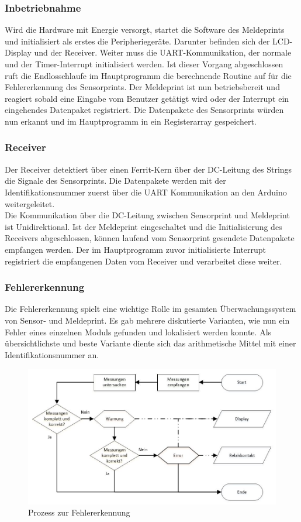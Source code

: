 \subsubsection{Inbetriebnahme}
Wird die Hardware mit Energie versorgt, startet die Software des Meldeprints und initialisiert als erstes die Peripheriegeräte. Darunter befinden sich der LCD-Display und der Receiver. Weiter muss die UART-Kommunikation, der normale und der Timer-Interrupt initialisiert werden. Ist dieser Vorgang abgeschlossen ruft die Endlosschlaufe im Hauptprogramm die berechnende Routine auf für die Fehlererkennung des Sensorprints. Der Meldeprint ist nun betriebsbereit und reagiert sobald eine Eingabe vom Benutzer getätigt wird oder der Interrupt ein eingehendes Datenpaket registriert. Die Datenpakete des Sensorprints würden nun erkannt und im Hauptprogramm in ein Registerarray gespeichert.

\subsubsection{Receiver}
Der Receiver detektiert über einen Ferrit-Kern über der DC-Leitung des Strings die Signale des Sensorprints. Die Datenpakete werden mit der Identifikationsnummer zuerst über die UART Kommunikation an den Arduino weitergeleitet.\\
Die Kommunikation über die DC-Leitung zwischen Sensorprint und Meldeprint ist Unidirektional. Ist der Meldeprint eingeschaltet und die Initialisierung des Receivers abgeschlossen, können laufend vom Sensorprint gesendete Datenpakete empfangen werden. Der im Hauptprogramm zuvor initialisierte Interrupt registriert die empfangenen Daten vom Receiver und verarbeitet diese weiter.

\subsubsection{Fehlererkennung}
Die Fehlererkennung spielt eine wichtige Rolle im gesamten Überwachungssystem von Sensor- und Meldeprint. Es gab mehrere diskutierte Varianten, wie nun ein Fehler eines einzelnen Moduls gefunden und lokalisiert werden konnte. Als übersichtlichste und beste Variante diente sich das arithmetische Mittel mit einer Identifikationsnummer an.

\begin{figure}[htbp] 
  \centering
     \includegraphics[width=1\textwidth]{graphics/error-warning-scheme}
  \caption{Prozess zur Fehlererkennung}
  \label{fig:error-warning-scheme}
\end{figure}

